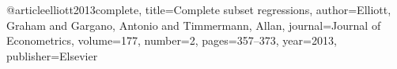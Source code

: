 @article{elliott2013complete,
  title={Complete subset regressions},
  author={Elliott, Graham and Gargano, Antonio and Timmermann, Allan},
  journal={Journal of Econometrics},
  volume={177},
  number={2},
  pages={357--373},
  year={2013},
  publisher={Elsevier}
}